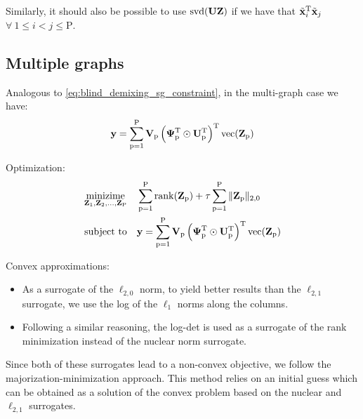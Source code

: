\documentclass{article}
\newcommand{\numSources}{\text{P}}
\newcommand{\sourceIndex}{\text{p}}
\DeclareMathOperator{\vect}{vec}
\DeclareMathOperator{\rank}{rank}
\DeclareMathOperator{\svd}{svd}
\begin{document}
Similarly, it should also be possible to use $\svd(\bbU \bbZ)$ if we have that $\tilde {{\mathbf x}}_{i}^{{\text{T}}} \tilde {{\mathbf x}}_{j}$ $\forall \ 1 \leqslant i < j \leqslant \numSources$.

\subsection*{Multiple graphs}

Analogous to \eqref{eq:blind_demixing_sg_constraint}, in the multi-graph case we have:
\begin{equation}
  \bby = \sum_{\sourceIndex=1}^{\numSources} \bbV_{\sourceIndex} \left(\bbPsi_{\sourceIndex}^{\rmT} \odot \bbU_{\sourceIndex}^{\rmT} \right)^{\rmT} \vect(\bbZ_{\sourceIndex})
\end{equation}

Optimization:
\begin{align}
  \mathop{\text{minizime}}_{\bbZ_{1},\bbZ_{2},\ldots,\bbZ_{\numSources}} \quad & \sum_{\sourceIndex=1}^{\numSources} \rank(\bbZ_{\sourceIndex}) + \tau \sum_{\sourceIndex=1}^{\numSources} \|\bbZ_{\sourceIndex}\|_{2,0} \\
  \text{subject to} \quad & \bby = \sum_{\sourceIndex=1}^{\numSources} \bbV_{\sourceIndex} \left(\bbPsi_{\sourceIndex}^{\rmT} \odot \bbU_{\sourceIndex}^{\rmT} \right)^{\rmT} \vect(\bbZ_{\sourceIndex}) \nonumber
\end{align}

Convex approximations:
\begin{itemize}
  \item As a surrogate of the $\ell_{2,0}$ norm, to yield better results than the $\ell_{2,1}$ surrogate, we use the log of the $\ell_{1}$ norms along the columns.
  \item Following a similar reasoning, the log-det is used as a surrogate of the rank minimization instead of the nuclear norm surrogate.
\end{itemize}

Since both of these surrogates lead to a non-convex objective, we follow the majorization-minimization approach. This method relies on an initial guess which can be obtained as a solution of the convex problem based on the nuclear and $\ell_{2,1}$ surrogates.
\end{document}
